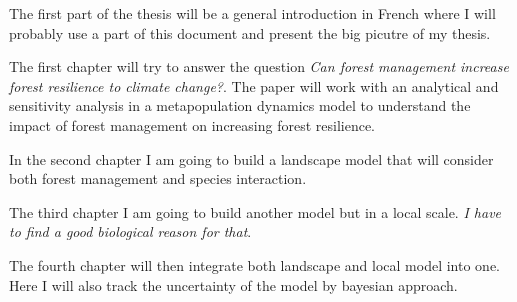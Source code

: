 \documentclass[a4paper,12pt,twoside]{article}
\begin{document}
The first part of the thesis will be a general introduction in French where  I will probably use a part of this document and present the big picutre of my thesis.

The first chapter will try to answer the question \textit{Can forest management increase forest resilience to climate change?}. The paper will work with an analytical and sensitivity analysis in a metapopulation dynamics model to understand the impact of forest management on increasing forest resilience.

In the second chapter I am going to build a landscape model that will consider both forest management and species interaction.

The third chapter I am going to build another model but in a local scale. \textit{I have to find a good biological reason for that}.

The fourth chapter will then integrate both landscape and local model into one. Here I will also track the uncertainty of the model by bayesian approach.



\end{document}
